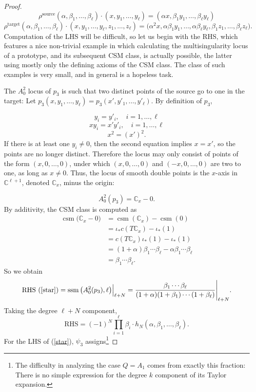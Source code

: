 \documentclass[11pt]{article}
\theoremstyle{plain}
\theoremstyle{definition}
\theoremstyle{definition}
\newcounter{equation}
\newcommand{\C}{\mathbb{C}}
\DeclareMathOperator{\csm}{csm}
\DeclareMathOperator{\ssm}{ssm}
\begin{document}
\begin{proof}
\[
\rho^{\text{source}}(\alpha,\beta_1,\dots,\beta_\ell)\cdot(x,y_1,\dots,y_\ell) = (\alpha x,\beta_1 y_1,\dots,\beta_\ell y_\ell)
\]
\[
\rho^{\text{target}}(\alpha,\beta_1,\dots,\beta_\ell)\cdot(x,y_1,\dots,y_\ell,z_1,\dots,z_\ell) = \big(\alpha^2 x,\alpha\beta_1 y_1,\dots,\alpha\beta_\ell y_\ell,\beta_1 z_1,\dots,\beta_\ell z_\ell\big).
\]
Computation of the LHS will be difficult, so let us begin with the RHS, which features a nice non-trivial example in which calculating the multisingularity locus of a prototype, and its subsequent CSM class, is actually possible, the latter using mostly only the defining axioms of the CSM class. The class of such examples is very small, and in general is a hopeless task.

The $A_0^2$ locus of $p_3$ is such that two distinct points of the source go to one in the target: Let $p_3(x,y_1,\dots,y_\ell) = p_3(x', y'_1,\dots,y'_\ell)$. By definition of $p_3$, 

\[
y_i=y'_i, \quad i=1,\dots,\ell
\]
\[
xy_i=x'y'_i, \quad i=1,\dots,\ell
\]
\[
x^2=(x')^2.
\]
If there is at least one $y_i\ne 0$, then the second equation implies $x=x'$, so the points are no longer distinct. Therefore the locus may only consist of points of the form $(x,0,\dots,0)$, under which $(x,0,\dots,0)$ and $(-x,0,\dots,0)$ are two to one, as long as $x\ne 0$. Thus, the locus of smooth double points is the $x$-axis in $\C^{\ell+1}$, denoted $\C_x$, minus the origin: 

\[
A_0^2(p_3) = \C_x- 0.
\]
By additivity, the CSM class is computed as
\begin{align*}
\csm\big(\C_x-0\big) &= \csm(\C_x)-\csm(0)\\
&=\iota_*c(T\C_x) - \iota_*(1)\\
&=c(T\C_x)\iota_*(1)-\iota_*(1)\\
&=(1+\alpha)\beta_1\cdots\beta_\ell - \alpha\beta_1\cdots\beta_\ell\\
&=\beta_1\cdots\beta_\ell.
\end{align*}
So we obtain
\[
\text{RHS (\ref{star})} = \ssm\big(A_0^2(p_3),\ell\big)\Big|_{\ell+N} = \frac{\beta_1\cdots\beta_\ell}{(1+\alpha)(1+\beta_1)\cdots(1+\beta_\ell)}\Bigg|_{\ell+N}.
\]
Taking the degree $\ell+N$ component,
\[
\text{RHS}=(-1)^N\prod_{i=1}^\ell\beta_i \cdot h_N(\alpha,\beta_1,\dots,\beta_\ell).
\]
For the LHS of (\ref{star}), $\psi_3$ assigns\footnote{The difficulty in analyzing the case $Q=A_1$ comes from exactly this fraction: There is no simple expression for the degree $k$ component of its Taylor expansion.} 


\end{proof}
\end{document}
